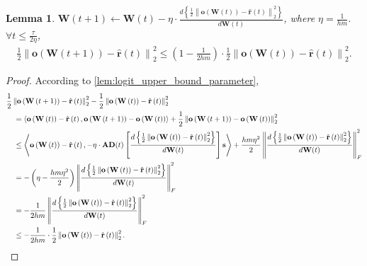 \documentclass[10pt]{article}
\def\rvo{{\mathbf{o}}}
\def\rvr{{\mathbf{r}}}
\def\rvs{{\mathbf{s}}}
\def\rvo{{\mathbf{o}}}
\newtheorem{lem}{Lemma}
\def\rmA{{\mathbf{A}}}
\def\rmD{{\mathbf{D}}}
\def\rmW{{\mathbf{W}}}
\begin{document}
\begin{lem}
\label{lem:logit_l2_loss_parameter_smoothness}
$\rmW(t+1) \leftarrow \rmW(t) - \eta \cdot \frac{d \left\{ \frac{1}{2} \left\| \rvo\left( \rmW\left(t\right)\right) - \hat{\rvr}\left(t\right) \right\|_2^2 \right\}}{d \rmW(t)}$, where $\eta = \frac{1}{h m}$. $\forall t \le \frac{\tau}{2 \eta}$,
\begin{equation*}
\begin{split}
    \frac{1}{2} \left\| \rvo\left( \rmW\left(t+1\right) \right) - \hat{\rvr}\left(t\right) \right\|_2^2 \le \left( 1 - \frac{1}{2 h m} \right) \cdot \frac{1}{2} \left\| \rvo\left( \rmW\left(t\right) \right) - \hat{\rvr}\left(t\right) \right\|_2^2.
\end{split}
\end{equation*}
\end{lem}
\begin{proof}
According to \cref{lem:logit_upper_bound_parameter},
\begin{equation*}
\begin{split}
    &\frac{1}{2} \left\| \rvo\left( \rmW\left(t+1\right) \right) - \hat{\rvr}\left(t\right) \right\|_2^2 - \frac{1}{2} \left\| \rvo\left( \rmW\left(t\right) \right) - \hat{\rvr}\left(t\right) \right\|_2^2 \\
    &\quad = \left\langle \rvo\left( \rmW\left(t\right) \right) - \hat{\rvr}\left(t\right), \rvo\left( \rmW\left(t+1\right) \right) - \rvo\left( \rmW\left(t\right) \right) \right\rangle + \frac{1}{2} \left\| \rvo\left( \rmW\left(t+1\right) \right) - \rvo\left( \rmW\left(t\right) \right) \right\|_2^2 \\
    &\quad \le \left\langle \rvo\left( \rmW\left(t\right) \right) - \hat{\rvr}\left(t\right), - \eta \cdot \rmA \rmD(t) \left[ \frac{d \left\{ \frac{1}{2} \left\| \rvo\left( \rmW\left(t\right)\right) - \hat{\rvr}\left(t\right) \right\|_2^2 \right\}}{d \rmW(t)} \right] \rvs \right\rangle + \frac{h m \eta^2}{2} \left\| \frac{d \left\{ \frac{1}{2} \left\| \rvo\left( \rmW\left(t\right)\right) - \hat{\rvr}\left(t\right) \right\|_2^2 \right\}}{d \rmW(t)}  \right\|_F^2 \\
    &\quad = - \left( \eta - \frac{h m \eta^2}{2} \right) \left\| \frac{d \left\{ \frac{1}{2} \left\| \rvo\left( \rmW\left(t\right)\right) - \hat{\rvr}\left(t\right) \right\|_2^2 \right\}}{d \rmW(t)}  \right\|_F^2 \\
    &\quad = - \frac{1}{2 h m} \left\| \frac{d \left\{ \frac{1}{2} \left\| \rvo\left( \rmW\left(t\right)\right) - \hat{\rvr}\left(t\right) \right\|_2^2 \right\}}{d \rmW(t)}  \right\|_F^2 \\
    &\quad \le - \frac{1}{2 h m} \cdot \frac{1}{2} \left\| \rvo\left( \rmW\left(t\right)\right) - \hat{\rvr}\left(t\right) \right\|_2^2. \qedhere
\end{split}
\end{equation*}
\end{proof}
\end{document}
